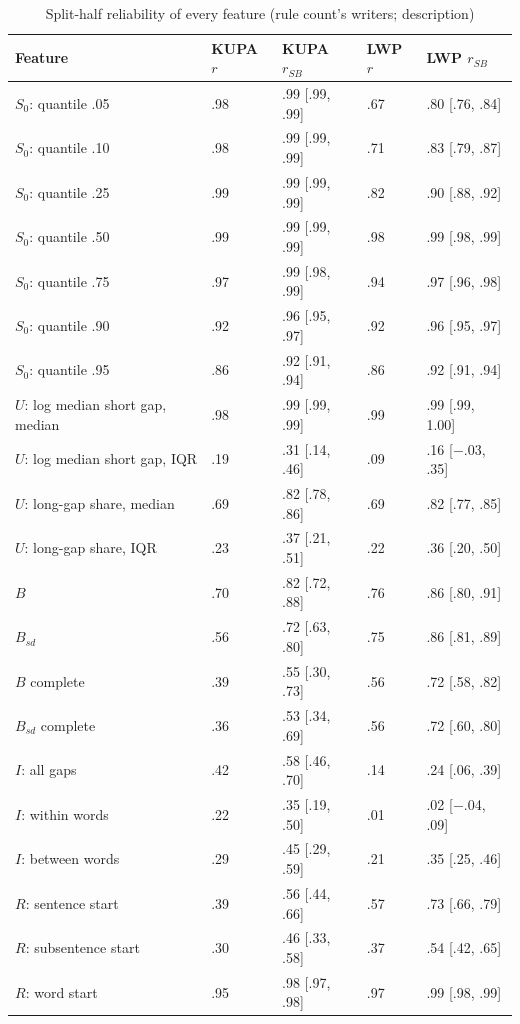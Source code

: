 \begin{table}[htbp]
\caption{Split-half reliability of every feature (rule count's writers; description)}
\label{tab:rel}
\scriptsize
\begin{tabularx}{\linewidth}{@{}lllll@{}}
\toprule
Feature & KUPA $r$ & KUPA $r_{SB}$ & LWP $r$ & LWP $r_{SB}$ \\
\midrule
$S_0$: quantile .05 & .98 & .99 [.99, .99] & .67 & .80 [.76, .84] \\
$S_0$: quantile .10 & .98 & .99 [.99, .99] & .71 & .83 [.79, .87] \\
$S_0$: quantile .25 & .99 & .99 [.99, .99] & .82 & .90 [.88, .92] \\
$S_0$: quantile .50 & .99 & .99 [.99, .99] & .98 & .99 [.98, .99] \\
$S_0$: quantile .75 & .97 & .99 [.98, .99] & .94 & .97 [.96, .98] \\
$S_0$: quantile .90 & .92 & .96 [.95, .97] & .92 & .96 [.95, .97] \\
$S_0$: quantile .95 & .86 & .92 [.91, .94] & .86 & .92 [.91, .94] \\
$U$: log median short gap, median & .98 & .99 [.99, .99] & .99 & .99 [.99, 1.00] \\
$U$: log median short gap, IQR & .19 & .31 [.14, .46] & .09 & .16 [$-$.03, .35] \\
$U$: long-gap share, median & .69 & .82 [.78, .86] & .69 & .82 [.77, .85] \\
$U$: long-gap share, IQR & .23 & .37 [.21, .51] & .22 & .36 [.20, .50] \\
$B$ & .70 & .82 [.72, .88] & .76 & .86 [.80, .91] \\
$B_{sd}$ & .56 & .72 [.63, .80] & .75 & .86 [.81, .89] \\
$B$ complete & .39 & .55 [.30, .73] & .56 & .72 [.58, .82] \\
$B_{sd}$ complete & .36 & .53 [.34, .69] & .56 & .72 [.60, .80] \\
$I$: all gaps & .42 & .58 [.46, .70] & .14 & .24 [.06, .39] \\
$I$: within words & .22 & .35 [.19, .50] & .01 & .02 [$-$.04, .09] \\
$I$: between words & .29 & .45 [.29, .59] & .21 & .35 [.25, .46] \\
$R$: sentence start & .39 & .56 [.44, .66] & .57 & .73 [.66, .79] \\
$R$: subsentence start & .30 & .46 [.33, .58] & .37 & .54 [.42, .65] \\
$R$: word start & .95 & .98 [.97, .98] & .97 & .99 [.98, .99] \\

\end{tabularx}
\end{table}
